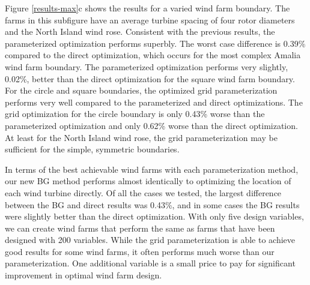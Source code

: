 \documentclass[wes, manuscript]{copernicus}
\begin{document}
Figure \ref{results-max}c shows the results for a varied wind farm boundary. The farms in this subfigure have an average turbine spacing of four rotor diameters and the North Island wind rose. Consistent with the previous results, the parameterized optimization performs superbly. The worst case difference is 0.39\% compared to the direct optimization, which occurs for the most complex Amalia wind farm boundary. The parameterized optimization performs very slightly, 0.02\%, better than the direct optimization for the square wind farm boundary. For the circle and square boundaries, the optimized grid parameterization performs very well compared to the parameterized and direct optimizations. The grid optimization for the circle boundary is only 0.43\% worse than the parameterized optimization and only 0.62\% worse than the direct optimization. At least for the North Island wind rose, the grid parameterization may be sufficient for the simple, symmetric boundaries.
 
In terms of the best achievable wind farms with each parameterization method, our new  BG method performs almost identically to optimizing the location of each wind turbine directly. Of all the cases we tested, the largest difference between the BG and direct results was 0.43\%, and in some cases the BG results were slightly better than the direct optimization. With only five design variables, we can create wind farms that perform the same as farms that have been designed with 200 variables. While the grid parameterization is able to achieve good results for some wind farms, it often performs much worse than our parameterization. One additional variable is a small price to pay for significant improvement in optimal wind farm design. 

\end{document}
